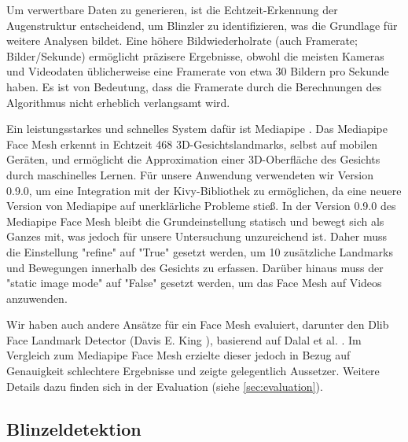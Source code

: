 Um verwertbare Daten zu generieren, ist die Echtzeit-Erkennung der Augenstruktur entscheidend, um Blinzler zu identifizieren, was die Grundlage für weitere Analysen bildet. Eine höhere Bildwiederholrate (auch Framerate; Bilder/Sekunde) ermöglicht präzisere Ergebnisse, obwohl die meisten Kameras und Videodaten üblicherweise eine Framerate von etwa 30 Bildern pro Sekunde haben. Es ist von Bedeutung, dass die Framerate durch die Berechnungen des Algorithmus nicht erheblich verlangsamt wird. 

Ein leistungsstarkes und schnelles System dafür ist Mediapipe \cite{LU19}. Das Mediapipe Face Mesh erkennt in Echtzeit 468 3D-Gesichtslandmarks, selbst auf mobilen Geräten, und ermöglicht die Approximation einer 3D-Oberfläche des Gesichts durch maschinelles Lernen. Für unsere Anwendung verwendeten wir Version 0.9.0, um eine Integration mit der Kivy-Bibliothek zu ermöglichen, da eine neuere Version von Mediapipe auf unerklärliche Probleme stieß. In der Version 0.9.0 des Mediapipe Face Mesh bleibt die Grundeinstellung statisch und bewegt sich als Ganzes mit, was jedoch für unsere Untersuchung unzureichend ist. Daher muss die Einstellung "refine" auf "True" gesetzt werden, um 10 zusätzliche Landmarks und Bewegungen innerhalb des Gesichts zu erfassen. Darüber hinaus muss der "static image mode" auf "False" gesetzt werden, um das Face Mesh auf Videos anzuwenden. 

Wir haben auch andere Ansätze für ein Face Mesh evaluiert, darunter den Dlib Face Landmark Detector (Davis E. King \cite{DLIB09}), basierend auf Dalal et al. \cite{DA05}. Im Vergleich zum Mediapipe Face Mesh erzielte dieser jedoch in Bezug auf Genauigkeit schlechtere Ergebnisse und zeigte gelegentlich Aussetzer. Weitere Details dazu finden sich in der Evaluation (siehe \ref{sec:evaluation}).

\subsection{Blinzeldetektion}
\label{sec:blinkdetection}

